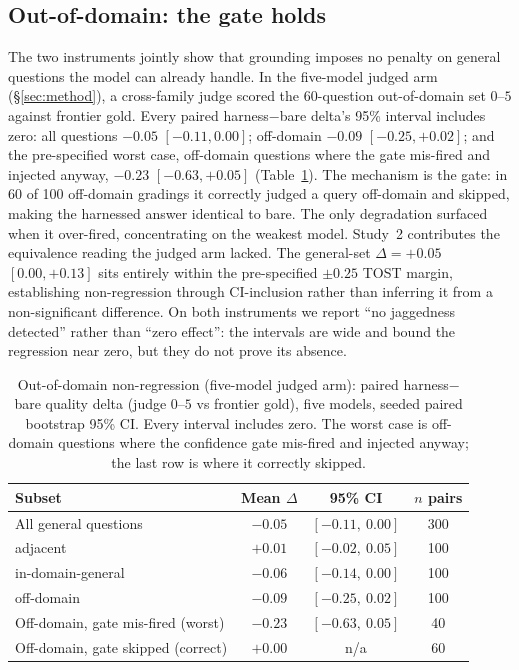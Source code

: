 \documentclass[10pt,twocolumn]{article}
\begin{document}
\subsection{Out-of-domain: the gate holds}\label{sec:ood}
The two instruments jointly show that grounding imposes no penalty on general questions the model can already handle. In the five-model judged arm (\S\ref{sec:method}), a cross-family judge scored the 60-question out-of-domain set $0$--$5$ against frontier gold. Every paired harness$-$bare delta’s 95\% interval includes zero: all questions $-0.05$ $[-0.11,0.00]$; off-domain $-0.09$ $[-0.25,+0.02]$; and the pre-specified worst case, off-domain questions where the gate mis-fired and injected anyway, $-0.23$ $[-0.63,+0.05]$ (Table~\ref{tab:ood}). The mechanism is the gate: in 60 of 100 off-domain gradings it correctly judged a query off-domain and skipped, making the harnessed answer identical to bare. The only degradation surfaced when it over-fired, concentrating on the weakest model. Study~2 contributes the equivalence reading the judged arm lacked. The general-set $\Delta=+0.05$ $[0.00,+0.13]$ sits entirely within the pre-specified $\pm0.25$ TOST margin, establishing non-regression through CI-inclusion rather than inferring it from a non-significant difference. On both instruments we report ``no jaggedness detected'' rather than ``zero effect'': the intervals are wide and bound the regression near zero, but they do not prove its absence.

\begin{table}[t]\centering\small
\caption{Out-of-domain non-regression (five-model judged arm): paired harness$-$bare quality delta (judge
$0$--$5$ vs frontier gold), five models, seeded paired bootstrap 95\% CI. Every interval includes
zero. The worst case is off-domain questions where the confidence gate mis-fired and injected anyway;
the last row is where it correctly skipped.}
\label{tab:ood}
\begin{tabular}{lccc}
\toprule
Subset & Mean $\Delta$ & 95\% CI & $n$ pairs \\
\midrule
All general questions              & $-0.05$ & $[-0.11,\ 0.00]$ & 300 \\
\quad adjacent                     & $+0.01$ & $[-0.02,\ 0.05]$ & 100 \\
\quad in-domain-general            & $-0.06$ & $[-0.14,\ 0.00]$ & 100 \\
\quad off-domain                   & $-0.09$ & $[-0.25,\ 0.02]$ & 100 \\
Off-domain, gate mis-fired (worst) & $-0.23$ & $[-0.63,\ 0.05]$ & 40 \\
Off-domain, gate skipped (correct) & $+0.00$ & n/a              & 60 \\
\bottomrule
\end{tabular}
\end{table}
\end{document}
